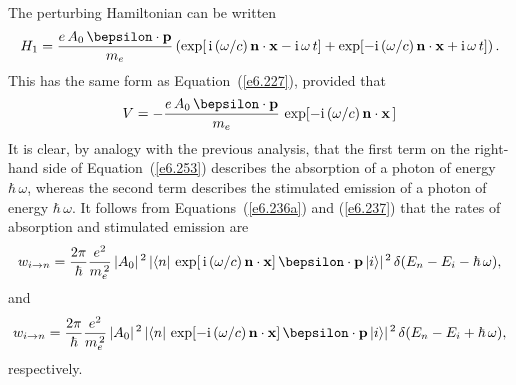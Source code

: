 The perturbing Hamiltonian can be written
\begin{equation}\label{e6.253}
H_1 =  \frac{e \,A_0\, \bepsilon \cdot{\bf p} }{m_e}
\left(\exp[\,{\rm i}\,(\omega/c)\, {\bf n}\cdot{\bf x} - {\rm i}\,
\omega\, t] +  \exp[-{\rm i}\,(\omega/c)\, {\bf n}\cdot{\bf x} + {\rm i}\,
\omega\, t]\right).
\end{equation}
This has the same form as Equation~(\ref{e6.227}), provided that
\begin{equation}
V = - \frac{e \,A_0\, \bepsilon \cdot{\bf p} }{m_e}\, \exp[-{\rm i}\,(\omega/c)\, {\bf n}\cdot{\bf x}\,]
\end{equation}
It is clear, by analogy with the previous analysis, that the first
term on the right-hand side of Equation~(\ref{e6.253}) describes the absorption
of a photon of energy $\hbar\,\omega$, whereas the second term describes
the stimulated emission of a photon of energy $\hbar\,\omega$. It follows from
Equations~(\ref{e6.236a}) and (\ref{e6.237}) that the rates of absorption and stimulated emission are
\begin{equation}\label{e8.140rx}
w_{i\rightarrow n} = \frac{2\pi}{\hbar} \frac{e^2}{m_e^{\,2}}\,
|A_0|^{\,2}\, |\langle n|\, \exp[\,{\rm i}\,(\omega/c)\,{\bf n}\cdot{\bf x}]\,
\bepsilon\cdot{\bf p} \,|i\rangle|^{\,2}\,
\delta(E_n-E_i -\hbar\,\omega),
\end{equation}
and
\begin{equation}\label{e8.141rx}
w_{i\rightarrow n} = \frac{2\pi}{\hbar} \frac{e^2}{m_e^{\,2}}\,
|A_0|^{\,2}\, |\langle n|\, \exp[-{\rm i}\,(\omega/c)\,{\bf n}\cdot{\bf x}]\,
\bepsilon\cdot{\bf p} \,|i\rangle|^{\,2}\,
\delta(E_n-E_i +\hbar\,\omega),
\end{equation}
respectively. 

